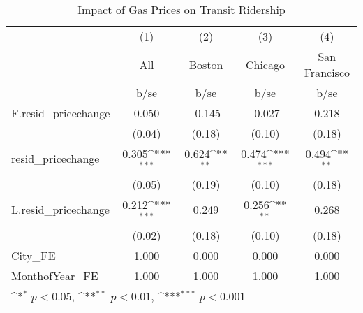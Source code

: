 \begin{table}[htbp]\centering
\def\sym#1{\ifmmode^{#1}\else\(^{#1}\)\fi}
\caption{Impact of Gas Prices on Transit Ridership}
\begin{tabular}{l*{4}{c}}
\hline\hline
            &\multicolumn{1}{c}{(1)}&\multicolumn{1}{c}{(2)}&\multicolumn{1}{c}{(3)}&\multicolumn{1}{c}{(4)}\\
            &\multicolumn{1}{c}{All}&\multicolumn{1}{c}{Boston}&\multicolumn{1}{c}{Chicago}&\multicolumn{1}{c}{San Francisco}\\
            &        b/se         &        b/se         &        b/se         &        b/se         \\
\hline
F.resid\_pricechange&       0.050         &      -0.145         &      -0.027         &       0.218         \\
            &      (0.04)         &      (0.18)         &      (0.10)         &      (0.18)         \\
resid\_pricechange&       0.305\sym{***}&       0.624\sym{**} &       0.474\sym{***}&       0.494\sym{**} \\
            &      (0.05)         &      (0.19)         &      (0.10)         &      (0.18)         \\
L.resid\_pricechange&       0.212\sym{***}&       0.249         &       0.256\sym{**} &       0.268         \\
            &      (0.02)         &      (0.18)         &      (0.10)         &      (0.18)         \\
\hline
City\_FE     &       1.000         &       0.000         &       0.000         &       0.000         \\
MonthofYear\_FE&       1.000         &       1.000         &       1.000         &       1.000         \\
\hline\hline
\multicolumn{5}{l}{\footnotesize \sym{*} \(p<0.05\), \sym{**} \(p<0.01\), \sym{***} \(p<0.001\)}\\
\end{tabular}
\end{table}
